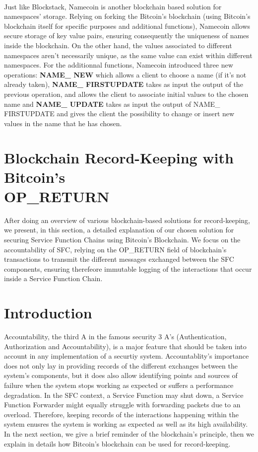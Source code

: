 \\
Just like Blockstack, Namecoin is another blockchain based solution for namespaces' storage. Relying on forking the Bitcoin's blockchain (using Bitcoin's blockchain itself for specific purposes and additional functions), Namecoin allows secure storage of key value pairs, ensuring consequently the uniqueness of names inside the blockchain. On the other hand, the values associated to different namespaces aren't necessarily unique, as the same value can exist within different namespaces. For the additionnal functions, Namecoin introduced three new operations: \textbf{NAME\_ NEW} which allows a client to choose a name (if it's not already taken), \textbf{NAME\_ FIRSTUPDATE} takes as input the output of the previous operation, and allows the client to associate initial values to the chosen name and \textbf{NAME\_ UPDATE}  takes as input the output of NAME\_ FIRSTUPDATE and gives the client the possibility to change or insert new values in the name that he has chosen.
\newpage
\section{Blockchain Record-Keeping with Bitcoin's \\OP\_RETURN}
After doing an overview of various blockchain-based solutions for record-keeping, we present, in this section, a detailed explanation of our chosen solution for securing Service Function Chains using Bitcoin’s Blockchain. We focus on the accountability
of SFC, relying on the OP\_RETURN field of blockchain’s transactions to transmit the different messages exchanged between the SFC components,
ensuring therefeore immutable logging of the interactions that occur inside a Service Function Chain.
\section{Introduction}
Accountability, the third A in the famous security 3 A's (Authentication, Authorization and Accountability), is a major feature that should be taken into account in any implementation of a securtiy system. Accountablity's importance does not only lay in providing records of the different exchanges between the system's components, but it does also allow identifying points and sources of failure when the system stops working as expected or suffers a performance degradation. In the SFC context, a Service Function may shut down, a Service Function Forwarder might equally struggle with forwarding packets due to an overload. Therefore, keeping records of the interactions happening within the system enusres the system is working as expected as well as its high availability. In the next section, we give a brief reminder of the blockchain's principle, then we explain in details how Bitcoin's blockchain can be used for record-keeping.
